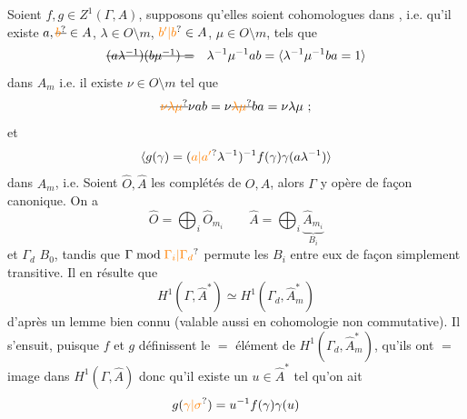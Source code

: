 Soient $f,g\in Z^1(\Gamma,A)$, supposons qu'elles soient cohomologues dans , i.e. qu'il existe $a,\deleted{\unsure{b}}\in A$, $\lambda\in O\setminus m$,  $\unsure{b'|b}\in A$, $\mu\in O\setminus m$, tels que
\[
\deleted{(a\lambda^{-1})(b\mu^{-1})=}\quad\lambda^{-1}\mu^{-1}ab=\inserted{\lambda^{-1}\mu^{-1}ba=1}
\]
dans $A_m$ i.e. il existe $\nu\in O\setminus m$ tel que
\[
\deleted{\unsure{\nu\lambda\mu}}\nu ab=\nu\deleted{\unsure{\lambda\mu}}ba=\nu\lambda\mu\ ;
\]
et 
\[
\inserted{g(\gamma)=(\unsure{a|a'}\lambda^{-1})^{-1}f(\gamma)\gamma(a\lambda^{-1})}
\]
dans $A_m$, i.e.
Soient $\widehat{O},\widehat{A}$ les complétés de $O,A$, alors $\Gamma$ y opère de façon canonique. On a
\[
\widehat{O}=\bigoplus_i\widehat{O}_{m_i}\qquad\widehat{A}=\bigoplus_i\underbrace{\widehat{A}_{m_i}}_{B_i}
\]
et $\Gamma_d$  $B_0$, tandis que $\Gamma\bmod\unsure{\Gamma_i|\Gamma_d}$ permute les $B_i$ entre eux de façon simplement transitive. Il en résulte que
\[
H^1(\Gamma,\widehat{A}^*)\simeq H^1(\Gamma_d,\widehat{A}_m^*)
\]
d'après un lemme bien connu (valable aussi en cohomologie non commutative). Il s'ensuit, puisque $f$ et $g$ définissent le $=$ élément de $H^1(\Gamma_d,\widehat{A}_m^*)$,  \inserted{[on regarde le diagramme commutatif}
\inserted{]} qu'ils ont $=$ image dans $H^1(\Gamma,\widehat{A})$ donc qu'il existe un $u\in\widehat{A}^*$ tel qu'on ait
\[
g(\unsure{\gamma|\sigma})=u^{-1}f(\gamma)\gamma(u)
\]
